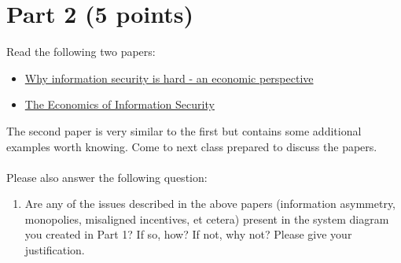 \documentclass[11pt]{article}
\begin{document}
\section*{Part 2 (5 points)}

Read the following two papers:
\begin{itemize}
    \item \href{https://ieeexplore.ieee.org/abstract/document/991552}{Why information security is hard - an economic perspective}
    \item \href{https://www.science.org/doi/full/10.1126/science.1130992}{The Economics of Information Security}
\end{itemize}

The second paper is very similar to the first but contains some additional examples worth knowing.
Come to next class prepared to discuss the papers.
\\ \\
Please also answer the following question:

\begin{enumerate}
    \item Are any of the issues described in the above papers (information asymmetry, monopolies, misaligned incentives, et cetera) present in the system diagram you created in Part 1? If so, how? If not, why not? Please give your justification.
\end{enumerate}





\end{document}

